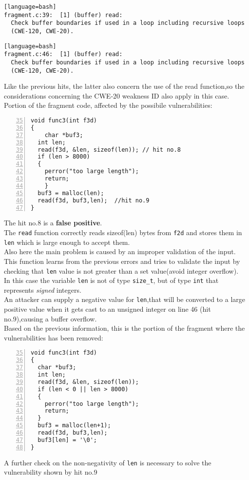 \documentclass[a4paper,12pt]{article}
\begin{document}
\begin{lstlisting}[style=DOS][language=bash]
fragment.c:39:  [1] (buffer) read:
  Check buffer boundaries if used in a loop including recursive loops
  (CWE-120, CWE-20).
\end{lstlisting}

\begin{lstlisting}[style=DOS][language=bash]
fragment.c:46:  [1] (buffer) read:
  Check buffer boundaries if used in a loop including recursive loops
  (CWE-120, CWE-20).
\end{lstlisting}
Like the previous hits, the latter also concern the use of the read function,so the considerations concerning the CWE-20 weakness ID also apply in this case.\\

\noindent
Portion of the fragment code, affected by the possibile vulnerabilities:
\begin{lstlisting}[style=c,numbers=left,firstnumber=35,linebackgroundcolor={
\ifnum\value{lstnumber}=39\color{green}\fi
\ifnum\value{lstnumber}=46\color{red}\fi}]
void func3(int f3d)
{
	char *buf3;
  int len;
  read(f3d, &len, sizeof(len)); // hit no.8
  if (len > 8000) 
  { 
  	perror("too large length");
  	return; 
	}
  buf3 = malloc(len);
  read(f3d, buf3,len);	//hit no.9
}
\end{lstlisting}
The hit no.8 is a \textbf{false positive}.\\
The \texttt{read} function correctly reads sizeof(len) bytes from \texttt{f2d} and stores them in \texttt{len} which is large enough to accept them.\\
Also here the main problem is caused by an improper validation of the input.\\
This function learns from the previous errors and tries to validate the input by checking that \texttt{len} value is not greater than a set value(avoid integer overflow).\\
In this case the variable \texttt{len} is not of type \texttt{size\_t}, but of type \texttt{int} that represents \emph{signed} integers.\\
An attacker can supply a negative value for \texttt{len},that  will be converted to a large positive value when it gets cast to an unsigned integer on line 46 (hit no.9),causing a buffer overflow.\\
\newpage
\noindent
Based on the previous information, this is the portion of the fragment where the vulnerabilities has been removed:
\begin{lstlisting}[style=c,numbers=left,firstnumber=35,linebackgroundcolor={
\ifnum\value{lstnumber}=39\color{green}\fi
\ifnum\value{lstnumber}=40\color{green}\fi
\ifnum\value{lstnumber}=46\color{green}\fi}]
void func3(int f3d)
{
  char *buf3;
  int len;
  read(f3d, &len, sizeof(len));
  if (len < 0 || len > 8000) 
  { 
  	perror("too large length");
  	return; 
  }
  buf3 = malloc(len+1);
  read(f3d, buf3,len);
  buf3[len] = '\0';        
}
\end{lstlisting}
A further check on the non-negativity of \texttt{len} is necessary to solve the vulnerability shown by hit no.9
\newpage
\end{document}
